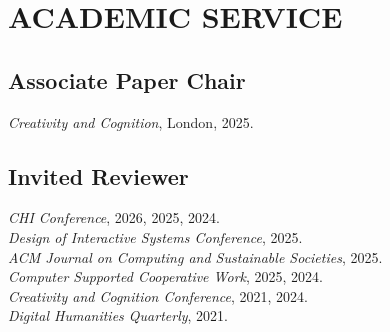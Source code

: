  \section{ACADEMIC SERVICE}

 \subsection{Associate Paper Chair}
  \emph{Creativity and Cognition}, London, 2025.\\
 
  \subsection{Invited Reviewer}
     \emph{CHI Conference}, 2026, 2025, 2024. \\
     \emph{Design of Interactive Systems Conference}, 2025. \\
     \emph{ACM Journal on Computing and Sustainable Societies}, 2025. \\
     \emph{Computer Supported Cooperative Work}, 2025, 2024. \\
     \emph{Creativity and Cognition Conference}, 2021, 2024. \\
  \emph{Digital Humanities Quarterly}, 2021. \\
